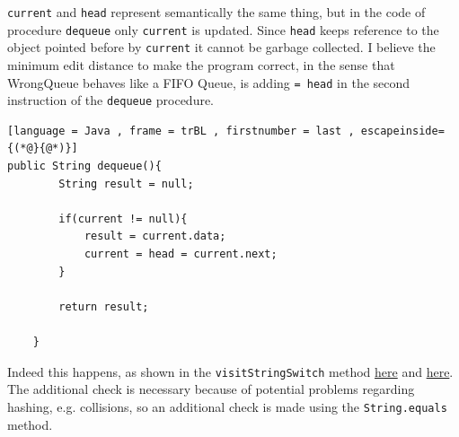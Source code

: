\documentclass[11pt]{article}
\begin{document}
\begin{question}


\verb|current| and \verb|head| represent semantically the same thing, but in the code of procedure \verb|dequeue| only \verb|current| is updated. Since \verb|head| keeps reference to the object pointed before by \verb|current| it cannot be garbage collected. I believe the minimum edit distance to make the program correct, in the sense that WrongQueue behaves like a FIFO Queue, is adding \verb|= head| in the second instruction of the \verb|dequeue| procedure.

\begin{lstlisting}[language = Java , frame = trBL , firstnumber = last , escapeinside={(*@}{@*)}]
public String dequeue(){
        String result = null;
        
        if(current != null){
            result = current.data;
            current = head = current.next;
        }

        return result;
	    
    }
\end{lstlisting}

\end{question}

\newpage

\begin{question}



Indeed this happens, as shown in the \verb|visitStringSwitch| method \href{https://github.com/openjdk/jdk/blob/309b929147e7dddfa27879ff31b1eaad271def85/src/jdk.compiler/share/classes/com/sun/tools/javac/comp/Lower.java#L3940}{here} and \href{https://hg.openjdk.org/jdk7u/jdk7u/langtools/file/41b81b3e37cd/src/share/classes/com/sun/tools/javac/comp/Lower.java#l3397}{here}.\\
The additional check is necessary because of potential problems regarding hashing, e.g. collisions, so an additional check is made using the \verb|String.equals| method.


\end{question}
\end{document}
